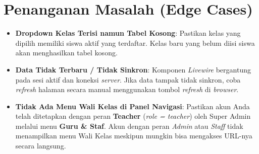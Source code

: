 \section{Penanganan Masalah (Edge Cases)}
\begin{itemize}
    \item \textbf{Dropdown Kelas Terisi namun Tabel Kosong}: Pastikan kelas yang dipilih memiliki siswa aktif yang terdaftar. Kelas baru yang belum diisi siswa akan menghasilkan tabel kosong.
    \item \textbf{Data Tidak Terbaru / Tidak Sinkron}: Komponen \textit{Livewire} bergantung pada sesi aktif dan koneksi \textit{server}. Jika data tampak tidak sinkron, coba \textit{refresh} halaman secara manual menggunakan tombol \textit{refresh} di \textit{browser}.
    \item \textbf{Tidak Ada Menu Wali Kelas di Panel Navigasi}: Pastikan akun Anda telah ditetapkan dengan peran \textbf{Teacher} (\textit{role = teacher}) oleh Super Admin melalui menu \textbf{Guru \& Staf}. Akun dengan peran \textit{Admin} atau \textit{Staff} tidak menampilkan menu Wali Kelas meskipun mungkin bisa mengakses URL-nya secara langsung.
\end{itemize}
